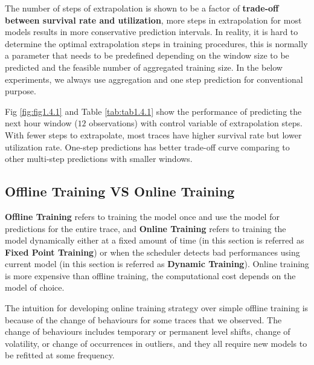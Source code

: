\documentclass{article}
\begin{document}
\begin{flushleft}
The number of steps of extrapolation is shown to be a factor of
\textbf{trade-off between survival rate and utilization}, more steps in
extrapolation for most models results in more conservative prediction intervals.
In reality, it is hard to determine the optimal extrapolation steps in training
procedures, this is normally a parameter that needs to be predefined depending
on the window size to be predicted and the feasible number of aggregated
training size. In the below experiments, we always use aggregation and one step
prediction for conventional purpose.
\end{flushleft}

\begin{flushleft}
Fig \ref{fig:fig1.4.1} and Table \ref{tab:tab1.4.1} show the performance of
predicting the next hour window ($12$ observations) with control variable of
extrapolation steps. With fewer steps to extrapolate, most traces have higher
survival rate but lower utilization rate. One-step predictions has better
trade-off curve comparing to other multi-step predictions with smaller windows.
\end{flushleft}

\subsection{Offline Training VS Online Training}

\begin{flushleft}
\textbf{Offline Training} refers to training the model once and use the model
for predictions for the entire trace, and \textbf{Online Training} refers to
training the model dynamically either at a fixed amount of time (in this section
is referred as \textbf{Fixed Point Training}) or when the scheduler detects bad
performances using current model (in this section is referred as \textbf{Dynamic
Training}). Online training is more expensive than offline training, the
computational cost depends on the model of choice.
\end{flushleft}

\begin{flushleft}
The intuition for developing online training strategy over simple offline
training is because of the change of behaviours for some traces that we
observed. The change of behaviours includes temporary or permanent level shifts,
change of volatility, or change of occurrences in outliers, and they all require
new models to be refitted at some frequency.
\end{flushleft}
\end{document}
